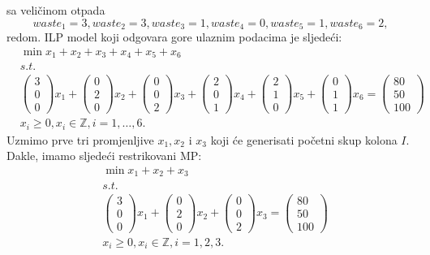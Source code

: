 \documentclass[b5paper, utf8, 11pt, colorlinks]{book}
\theoremstyle{definition}
\begin{document}
sa veličinom otpada 
$$ waste_1 = 3, waste_2 = 3, waste_3 = 1, waste_4 = 0, waste_5 = 1, waste_6 = 2,$$
redom. 
ILP model koji odgovara gore ulaznim podacima je sljedeći:
\begin{align*}
	 &\min x_1 + x_2 + x_3 + x_4 + x_5 + x_6 \\
	 &s.t. \\
	 &\begin{pmatrix}
	 	3 \\
	 	0 \\
	 	0  
	 \end{pmatrix} x_1 + \begin{pmatrix}
	 0 \\
	 2 \\
	 0  
 \end{pmatrix} x_2 +\begin{pmatrix}
 0 \\
 0 \\
 2  
\end{pmatrix} x_3 + 
 \begin{pmatrix}
	2 \\
	0 \\
	1  
\end{pmatrix} x_4 + 
 \begin{pmatrix}
	2 \\
	1 \\
	0  
\end{pmatrix} x_5 + 
\begin{pmatrix}
	0 \\
	1 \\
	1  
\end{pmatrix} x_6 = \begin{pmatrix}
      80 \\
      50 \\
      100
\end{pmatrix} \\
& x_i \geq 0, x_i \in \mathbb{Z}, i=1,\ldots,6.
\end{align*}
 Uzmimo prve tri promjenljive $x_1, x_2$ i $x_3$ koji će generisati početni skup kolona $I$.
 Dakle, imamo sljedeći restrikovani MP:
 \begin{align*}
 	 &\min x_1 + x_2 + x_3 \\
 	 & s.t. \\
 	 &\begin{pmatrix}
 	 	3 \\
 	 	0 \\
 	 	0  
 	 \end{pmatrix} x_1 + \begin{pmatrix}
 	 	0 \\
 	 	2 \\
 	 	0  
 	 \end{pmatrix} x_2 +\begin{pmatrix}
 	 	0 \\
 	 	0 \\
 	 	2  
 	 \end{pmatrix} x_3 = \begin{pmatrix}
  	     80 \\
  	     50 \\
  	     100
  \end{pmatrix} \\
  & x_i \geq 0, x_i \in \mathbb{Z}, i=1,2,3.
 \end{align*}  
\end{document}
